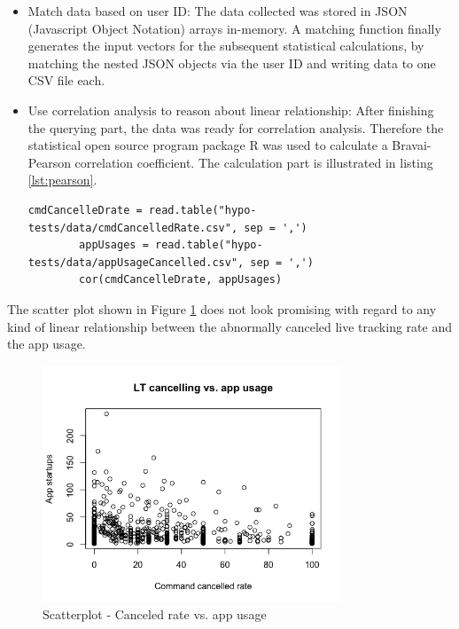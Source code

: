 \begin{enumerate}
\begin{itemize}
		\item Match data based on user ID: The data collected was stored in JSON (Javascript Object Notation) arrays in-memory. A matching function finally generates the input vectors for the subsequent statistical calculations, by matching the nested JSON objects via the user ID and writing data to one CSV file each. 
		\item Use correlation analysis to reason about linear relationship: After finishing the querying part, the data was ready for correlation analysis. Therefore the statistical open source program package R was used to calculate a Bravai-Pearson correlation coefficient. The calculation part is illustrated in listing \ref{lst:pearson}. 
		
		\begin{lstlisting}[caption={Calculation of pearson correlation and statistical test in R}, label={lst:pearson}]
		cmdCancelleDrate = read.table("hypo-tests/data/cmdCancelledRate.csv", sep = ',')
		appUsages = read.table("hypo-tests/data/appUsageCancelled.csv", sep = ',')
		cor(cmdCancelleDrate, appUsages)
		\end{lstlisting}
	\end{itemize}

	The scatter plot shown in Figure \ref{fig:canceledvsAppUsage} does not look promising with regard to any kind of linear relationship between the abnormally canceled live tracking rate and the app usage. 
	
	\begin{figure}
		\centering
		\includegraphics[width=0.8\textwidth]{img/LT_cancelled_rate_vs_app_usage.png}
		\caption{Scatterplot - Canceled rate vs. app usage}
		\label{fig:canceledvsAppUsage}
	\end{figure} 
	

\end{enumerate}
